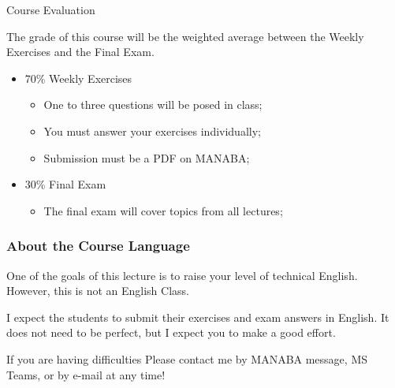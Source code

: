 \documentclass{beamer}
\begin{document}
\begin{frame}{Course Evaluation}{}

  The grade of this course will be the weighted average between the Weekly Exercises and the Final Exam.\bigskip

  \begin{itemize}
  \item 70\% Weekly Exercises
    \begin{itemize}
    \item One to three questions will be posed in class;
    \item You must answer your exercises individually;
    \item Submission must be a PDF on MANABA;
    \end{itemize}
    \bigskip

  \item 30\% Final Exam
  \begin{itemize}
    \item The final exam will cover topics from all lectures;
  \end{itemize}
  \end{itemize}
\end{frame}

\begin{frame}
  \frametitle{About the Course Language}

  One of the goals of this lecture is to raise your level of technical
  English. However, this is not an English Class.

  \bigskip

  I expect the students to submit their exercises and exam answers in
  English. It does not need to be perfect, but I expect you to make a
  good effort.

  \bigskip

  \begin{block}{If you are having difficulties}
    Please contact me by MANABA message, MS Teams, or by e-mail at any time!
  \end{block}

\end{frame}
\end{document}
